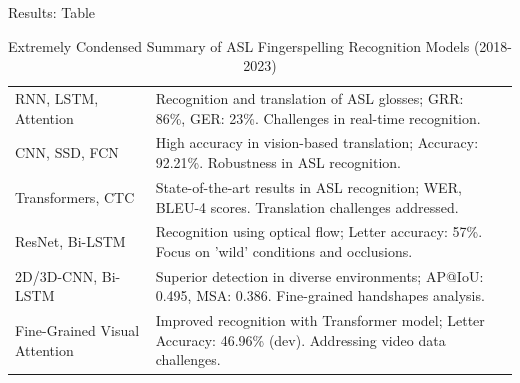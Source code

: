 \documentclass{beamer} %
\begin{document}
\begin{frame}[t]
\begin{columns}[t]
\begin{column}{0.3\textwidth}
\begin{block}{Results: Table}
\begin{footnotesize}
\begin{table}[H]
\begin{tabular}{p{} p{} p{}}
							RNN, LSTM, Attention          & Recognition and translation of ASL glosses; GRR: 86\%, GER: 23\%. Challenges in real-time recognition.         & \cite{skumarTimeSeriesNeural2018}                  \\
							CNN, SSD, FCN                 & High accuracy in vision-based translation; Accuracy: 92.21\%. Robustness in ASL recognition.                   & \cite{abiyevReconstructionConvolutionalNeural2020} \\
							Transformers, CTC             & State-of-the-art results in ASL recognition; WER, BLEU-4 scores. Translation challenges addressed.             & \cite{cihancamgozSignLanguageTransformers2020}     \\
							ResNet, Bi-LSTM               & Recognition using optical flow; Letter accuracy: 57\%. Focus on 'wild' conditions and occlusions.              & \cite{kabadeAmericanSignLanguage2023}              \\
							2D/3D-CNN, Bi-LSTM            & Superior detection in diverse environments; AP@IoU: 0.495, MSA: 0.386. Fine-grained handshapes analysis.       & \cite{shiFingerspellingDetectionAmerican2021}      \\
							Fine-Grained Visual Attention & Improved recognition with Transformer model; Letter Accuracy: 46.96\% (dev). Addressing video data challenges. & \cite{gajurelFineGrainedVisualAttention2021}       \\

							\bottomrule
						\end{tabular}
						\caption{Extremely Condensed Summary of ASL Fingerspelling Recognition Models (2018-2023)}
					\end{table}
				\end{footnotesize}
			\end{block}



\end{column}
\end{columns}
\end{frame}
\end{document}
